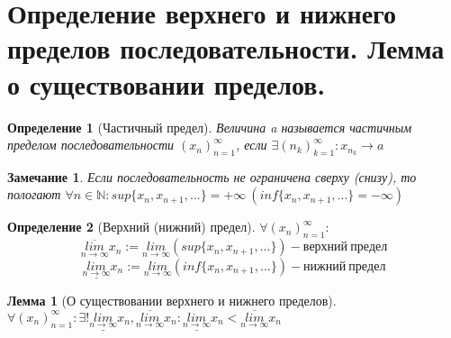 \documentclass[11pt,a4paper,titlepage]{article}
\newtheorem*{definition}{Определение}
\newtheorem*{remark}{Замечание}
\newtheorem*{lemma}{Лемма}
\renewcommand{\lim}[2]{\underset{#1 \rightarrow #2}{lim}}
\newcommand{\limn}{\lim{n}{\infty}}
\newcommand{\limsupn}{\overline{\limn}}
\newcommand{\liminfn}{\underline{\limn}}
\newcommand{\N}{\mathbb{N}}
\begin{document}
    \section{Определение верхнего и нижнего пределов последовательности. Лемма о существовании пределов.}

    \begin{definition}[Частичный предел]
        Величина a называется частичным пределом последовательности $(x_n)_{n=1}^\infty$, если $\exists (n_k)_{k=1}^\infty: x_{n_k} \to a$
    \end{definition}

    \begin{remark}
        Если последовательность не ограничена сверху (снизу), то пологают $\forall n \in \N: sup\{x_n, x_{n+1}, ...\} = +\infty\ (inf\{x_n, x_{n+1}, ...\} = -\infty)$
    \end{remark}

    \begin{definition}[Верхний (нижний) предел]
        $\forall (x_n)_{n=1}^\infty:$\\
        \[\limsupn x_n := \limn (sup \{x_n, x_{n+1}, ...\}) - верхний\ предел\]
        \[\liminfn x_n := \limn (inf \{x_n, x_{n+1}, ...\}) - нижний\ предел\]
    \end{definition}

    \begin{lemma}[О существовании верхнего и нижнего пределов]
        $\forall (x_n)_{n=1}^\infty: \exists!\liminfn x_n, \limsupn x_n: \liminfn x_n < \limsupn x_n$
    \end{lemma}
\end{document}
